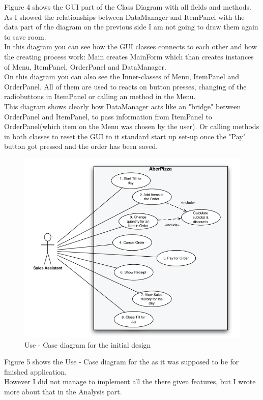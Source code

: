 \documentclass[11pt,a4paper]{article}
\begin{document}
\begin{flushleft}
Figure 4 shows the GUI part of the Class Diagram with all fields and methods.\\
As I showed the relationships between DataManager and ItemPanel with the data part of the diagram on the previous side I am not going to draw them again to save room.\\
In this diagram you can see how the GUI classes connects to each other and how the creating process work: Main creates MainForm which than creates instances of Menu, ItemPanel, OrderPanel and DataManager. \\
On this diagram you can also see the Inner-classes of Menu, ItemPanel and OrderPanel. All of them are used to reacts on button presses, changing of the radiobuttons in ItemPanel or calling an method in the Menu.\\
This diagram shows clearly how DataManager acts like an "bridge" between OrderPanel and ItemPanel, to pass information from ItemPanel to OrderPanel(which item on the Menu was chosen by the user). Or calling methods in both classes to reset the GUI to it standard start up 
set-up once the "Pay" button got pressed and the order has been saved.\\
\pagebreak
\begin{figure}[h]
	\centering
 	\includegraphics[width = 1\textwidth]{../Dia/use-case.PNG} 
	\caption{Use - Case diagram for the initial design}
	\label{fig5}
\end{figure}
Figure 5 shows the Use - Case diagram for the as it was supposed to be for finished application.\\
However I did not manage to implement all the there given features, but I wrote more about that in the Analysis part.\\
\newpage


\end{flushleft}
\end{document}
